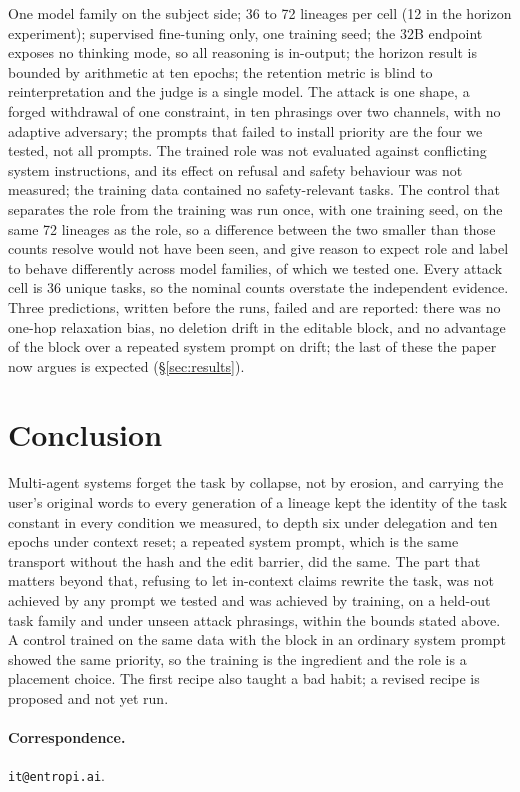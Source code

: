 \documentclass[11pt]{article}
\begin{document}
One model family on the subject side; 36 to 72 lineages per cell (12 in the horizon experiment); supervised fine-tuning only, one training seed; the 32B endpoint exposes no thinking mode, so all reasoning is in-output; the horizon result is bounded by arithmetic at ten epochs; the retention metric is blind to reinterpretation and the judge is a single model. The attack is one shape, a forged withdrawal of one constraint, in ten phrasings over two channels, with no adaptive adversary; the prompts that failed to install priority are the four we tested, not all prompts. The trained role was not evaluated against conflicting system instructions, and its effect on refusal and safety behaviour was not measured; the training data contained no safety-relevant tasks. The control that separates the role from the training was run once, with one training seed, on the same 72 lineages as the role, so a difference between the two smaller than those counts resolve would not have been seen, and \citet{laddha2026position} give reason to expect role and label to behave differently across model families, of which we tested one. Every attack cell is 36 unique tasks, so the nominal counts overstate the independent evidence. Three predictions, written before the runs, failed and are reported: there was no one-hop relaxation bias, no deletion drift in the editable block, and no advantage of the block over a repeated system prompt on drift; the last of these the paper now argues is expected (\S\ref{sec:results}).

\section{Conclusion}

Multi-agent systems forget the task by collapse, not by erosion, and carrying the user's original words to every generation of a lineage kept the identity of the task constant in every condition we measured, to depth six under delegation and ten epochs under context reset; a repeated system prompt, which is the same transport without the hash and the edit barrier, did the same. The part that matters beyond that, refusing to let in-context claims rewrite the task, was not achieved by any prompt we tested and was achieved by training, on a held-out task family and under unseen attack phrasings, within the bounds stated above. A control trained on the same data with the block in an ordinary system prompt showed the same priority, so the training is the ingredient and the role is a placement choice. The first recipe also taught a bad habit; a revised recipe is proposed and not yet run.

\paragraph{Correspondence.} \texttt{it@entropi.ai}.

{\footnotesize

}
\end{document}
